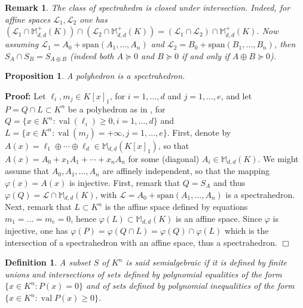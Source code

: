 \documentclass[a4paper,12pt]{article}
\newenvironment{proof}{\hbox{}\vspace{-0.8cm} {\bf Proof:}}{\hfill $\Box$}
\newtheorem{proposition}{Proposition}
\newtheorem{definition}{Definition}
\newtheorem{remark}{Remark}
\newcommand{\allmat}{\mathbb{M}} %
\renewcommand{\span}[1]{{\text{span}(#1)}} %
\DeclareMathOperator{\val}{val}
\begin{document}
\begin{remark}
  The class of spectrahedra is closed under intersection. Indeed, for affine spaces $\mathcal{L}_1,\mathcal{L}_2$
  one has $(\mathcal{L}_1 \cap \allmat_{d,d}^+(K)) \cap (\mathcal{L}_2 \cap \allmat_{d,d}^+(K)) =
  (\mathcal{L}_1 \cap \mathcal{L}_2) \cap \allmat_{d,d}^+(K)$. Now
  assuming $\mathcal{L}_1 = A_0+\span{A_1,\ldots,A_n}$ and $\mathcal{L}_2 = B_0+\span{B_1,\ldots,B_n}$,
  then $S_A \cap S_B = S_{A \oplus B}$ (indeed both $A \succeq 0$ and $B \succeq 0$ if and only if
  $A \oplus B \succeq 0$).
\end{remark}

\begin{proposition}
  A polyhedron is a spectrahedron.
\end{proposition}
\begin{proof}
  Let $\ell_i,m_j \in K[x]_1$, for $i=1,\ldots,d$ and $j=1,\ldots,e$, and let $P = Q \cap L \subset K^n$
  be a polyhedron as in , for $Q = \{x \in K^n : \val(\ell_i) \geq 0, i=1,\ldots,d\}$
  and $L = \{x \in K^n : \val(m_j) = +\infty, j=1,\ldots,e\}$.
  First, denote by $A(x) = \ell_1 \oplus \cdots \oplus \ell_d \in \allmat_{d,d}(K[x]_1)$,
  so that $A(x) = A_0+x_1A_1+\cdots+x_nA_n$ for some (diagonal) $A_i \in \allmat_{d,d}(K)$.
  We might assume that $A_0,A_1,\ldots,A_n$ are affinely independent, so that the mapping
  $\varphi(x) = A(x)$ is injective. 
  First, remark that $Q=S_A$ and thus $\varphi(Q) = \mathcal{L} \cap \allmat_{d,d}(K)$, with
  $\mathcal{L} = A_0+\span{A_1,\ldots,A_n}$ is a spectrahedron.
  Next, remark that $L \subset K^n$ is the affine space defined by equations $m_1=\ldots=m_e=0$,
  hence $\varphi(L) \subset \allmat_{d,d}(K)$ is an affine space. Since $\varphi$ is injective,
  one has $\varphi(P) = \varphi(Q \cap L) = \varphi(Q) \cap \varphi(L)$ which is the intersection
  of a spectrahedron with an affine space, thus a spectrahedron.
\end{proof}

\begin{definition}
  A subset $S$ of $K^n$ is said \emph{semialgebraic} if it is defined by finite unions and intersections of sets defined by polynomial equalities of the form $\{ x \in K^n  : P( x) = 0 \}$ and of sets defined by polynomial inequalities of the form $\{ x\in K^n : \val P(x) \geq 0 \}$.
\end{definition}
\end{document}
